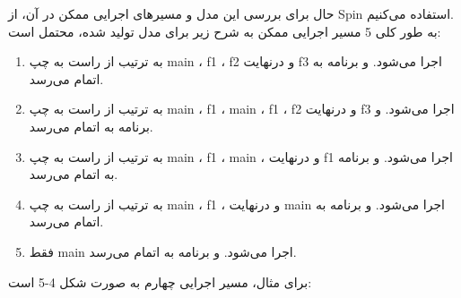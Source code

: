 حال برای بررسی این مدل و مسیرهای اجرایی ممکن در آن، از Spin استفاده می‌کنیم.
\\
به طور کلی 5 مسیر اجرایی ممکن به شرح زیر برای مدل تولید شده، محتمل است:

\begin{enumerate}
	\item به ترتیب از راست به چپ main ، f1  ، f2  و درنهایت f3 اجرا می‌‌شود. و برنامه به اتمام می‌رسد.
	\item به ترتیب از راست به چپ main ، f1  ،  main ، f1  ، f2  و درنهایت f3 اجرا می‌‌شود. و برنامه به اتمام می‌رسد.
	\item به ترتیب از راست به چپ main ، f1  ،  main ، و درنهایت f1 اجرا می‌‌شود. و برنامه به اتمام می‌رسد.
	\item به ترتیب از راست به چپ main ، f1  ، و درنهایت main اجرا می‌‌شود. و برنامه به اتمام می‌رسد.
	\item فقط main اجرا می‌‌شود. و برنامه به اتمام می‌رسد.
\end{enumerate}
برای مثال، مسیر اجرایی چهارم به صورت شکل 4-5 است:

